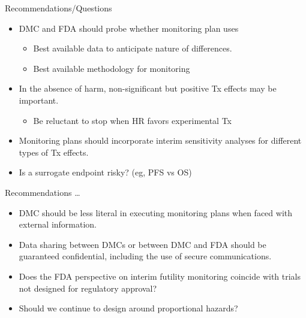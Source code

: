 \documentclass[ignorenonframetext,]{beamer}
\providecommand{\tightlist}{%
  \setlength{\itemsep}{0pt}\setlength{\parskip}{0pt}}
\begin{document}
\begin{frame}{%
\protect\hypertarget{recommendationsquestions}{%
Recommendations/Questions}}

\begin{itemize}
\item
  DMC and FDA should probe whether monitoring plan uses

  \begin{itemize}
  \item
    Best available data to anticipate nature of differences.
  \item
    Best available methodology for monitoring
  \end{itemize}
\item
  In the absence of harm, non-significant but positive Tx effects may be
  important.

  \begin{itemize}
  \tightlist
  \item
    Be reluctant to stop when HR favors experimental Tx
  \end{itemize}
\item
  Monitoring plans should incorporate interim sensitivity analyses for
  different types of Tx effects.
\item
  Is a surrogate endpoint risky? (eg, PFS vs OS)
\end{itemize}

\end{frame}

\begin{frame}{%
\protect\hypertarget{recommendations}{%
Recommendations \ldots}}

\begin{itemize}
\item
  DMC should be less literal in executing monitoring plans when faced
  with external information.
\item
  Data sharing between DMCs or between DMC and FDA should be guaranteed
  confidential, including the use of secure communications.
\item
  Does the FDA perspective on interim futility monitoring coincide with
  trials not designed for regulatory approval?
\item
  Should we continue to design around proportional hazards?
\end{itemize}

\end{frame}
\end{document}
